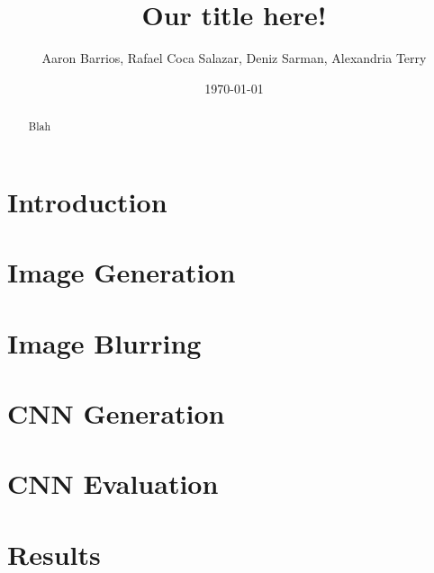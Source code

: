 \documentclass[11pt]{article}
\title{Our title here!}
\author{Aaron Barrios, Rafael Coca Salazar, Deniz Sarman, Alexandria Terry}
\date{\today}
\begin{document}
\maketitle


\begin{abstract}
      Blah
\end{abstract}



\section{Introduction}


\section{Image Generation}


\section{Image Blurring}


\section{CNN Generation}


\section{CNN Evaluation} %


\section{Results} %
\end{document}
